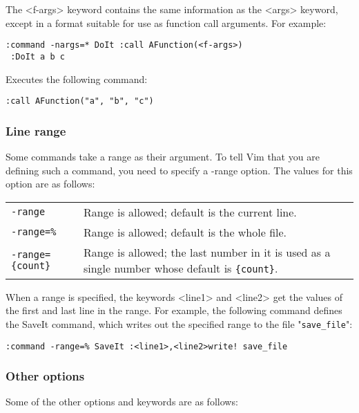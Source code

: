 The <f-args> keyword contains the same information as the <args> keyword, except in a format suitable for use as function call arguments.
For example:

\begin{Verbatim}[samepage=true]
 :command -nargs=* DoIt :call AFunction(<f-args>)
 :DoIt a b c
\end{Verbatim}

Executes the following command:

\begin{Verbatim}[samepage=true]
 :call AFunction("a", "b", "c")
\end{Verbatim}

\subsubsection{Line range}
Some commands take a range as their argument.
To tell Vim that you are defining such a command, you need to specify a -range option.
The values for this option are as follows:

\begin{center} \begin{tabularx}{0.75\textwidth}{l X}
				\texttt{-range} & Range is allowed; default is the current line. \\
				\texttt{-range=\%} & Range is allowed; default is the whole file. \\
				\texttt{-range=\{count\}} & Range is allowed; the last number in it is used as a single number whose default is \texttt{\{count\}}. \\
\end{tabularx} \end{center}

When a range is specified, the keywords <line1> and <line2> get the values of the first and last line in the range.
For example, the following command defines the SaveIt command, which writes out the specified range to the file "\texttt{save\_file}":

\begin{Verbatim}[samepage=true]
 :command -range=% SaveIt :<line1>,<line2>write! save_file
\end{Verbatim}
\subsubsection{Other options}
Some of the other options and keywords are as follows:

